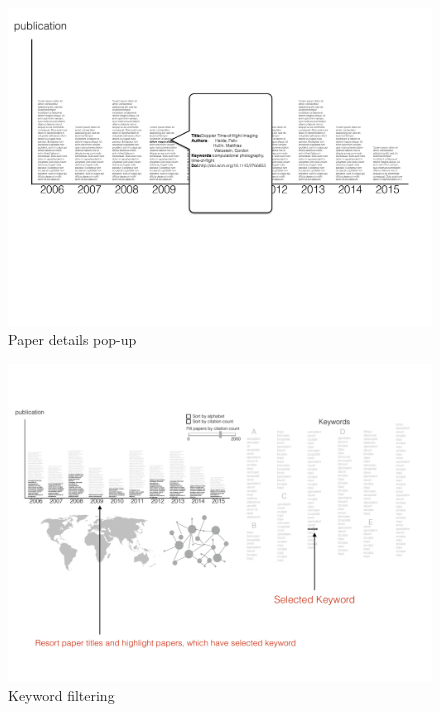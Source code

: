 \begin{figure}[htb!]
    \centering
    \includegraphics[width=160mm]{visproposalDrawing_page_Part_8.pdf}
    \caption{Paper details pop-up}
    \label{fig:pop-up}
\end{figure}

\begin{figure}[htb!]
    \centering
    \includegraphics[width=160mm]{visproposalDrawing_page_Part_4.pdf}
    \caption{Keyword filtering}
    \label{fig:click_keyword}
\end{figure}

